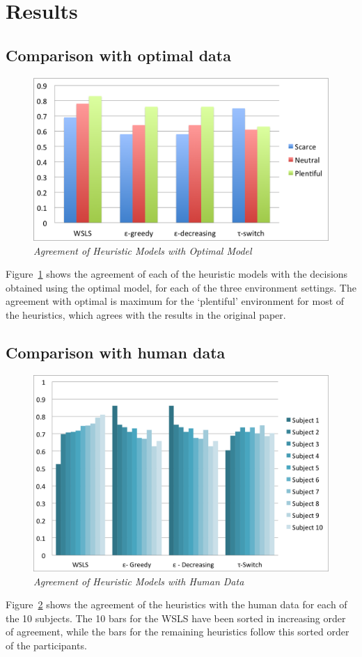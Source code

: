 \section{Results}
\label{results}

\subsection{Comparison with optimal data}

\begin{figure}[H]
\begin{center}
\includegraphics[scale=0.5]{optimalVsHeuristicNoTitle}
\caption{\small \sl \label{plot1} Agreement of Heuristic Models with Optimal Model}
\end{center}
\end{figure}

Figure~\ref{plot1} shows the agreement of each of the heuristic models with the decisions obtained using the optimal model, for each of the three environment settings. The agreement with optimal is maximum for the `plentiful' environment for most of the heuristics, which agrees with the results in the original paper.

\subsection{Comparison with human data}
\begin{figure}[H]
\begin{center}
\includegraphics[scale=0.5]{humanVsHeuristicNoTitle}
\caption{\small \sl \label{plot2} Agreement of Heuristic Models with Human Data}
\end{center}
\end{figure}

Figure~\ref{plot2} shows the agreement of the heuristics with the human data for each of the 10 subjects. The 10 bars for the WSLS have been sorted in increasing order of agreement, while the bars for the remaining heuristics follow this sorted order of the participants.
